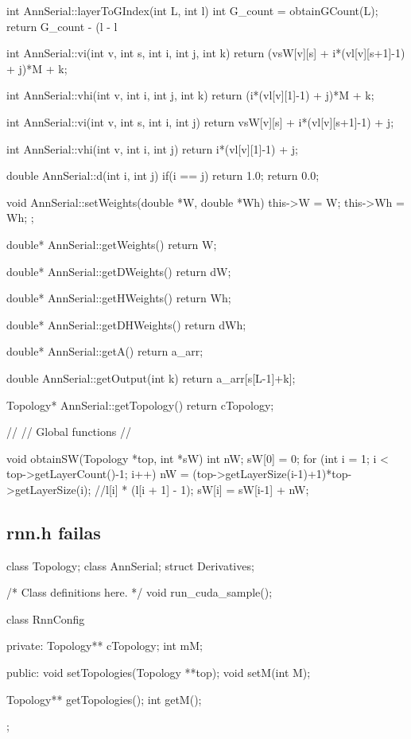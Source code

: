 int AnnSerial::layerToGIndex(int L, int l){
  int G\_count = obtainGCount(L);
  return G\_count - (l - l%
}

int AnnSerial::vi(int v, int s, int i, int j, int k){
  return (vsW[v][s] + i*(vl[v][s+1]-1) + j)*M + k;
}

int AnnSerial::vhi(int v, int i, int j, int k){
  return  (i*(vl[v][1]-1) + j)*M + k;
}

int AnnSerial::vi(int v, int s, int i, int j){
  return vsW[v][s] + i*(vl[v][s+1]-1) + j;
}

int AnnSerial::vhi(int v, int i, int j){
  return  i*(vl[v][1]-1) + j;
}

double AnnSerial::d(int i, int j){
  if(i == j) return 1.0;
  return 0.0;
}

void AnnSerial::setWeights(double *W, double *Wh){
  this->W = W;
  this->Wh = Wh;
};

double* AnnSerial::getWeights(){
	return W;
}

double* AnnSerial::getDWeights(){
	return dW;
}

double* AnnSerial::getHWeights(){
	return Wh;
}

double* AnnSerial::getDHWeights(){
	return dWh;
}

double* AnnSerial::getA(){
	return a\_arr;
}

double AnnSerial::getOutput(int k){
  return a\_arr[s[L-1]+k];
}


Topology* AnnSerial::getTopology(){
  return cTopology;
}

//
// Global functions
//


void obtainSW(Topology *top, int *sW){
  int nW;
  sW[0] = 0;
  for (int i = 1; i < top->getLayerCount()-1; i++) {
		nW = (top->getLayerSize(i-1)+1)*top->getLayerSize(i); //l[i] * (l[i + 1] - 1);
    sW[i] = sW[i-1] + nW;
  }
}

\subsection{rnn.h failas}

class Topology;
class AnnSerial;
struct Derivatives;

/* Class definitions here. */
void run\_cuda\_sample();

class RnnConfig{
private:
  Topology** cTopology;
  int mM;


public:
  void setTopologies(Topology **top);
  void setM(int M);


  Topology** getTopologies();
  int getM();

};



